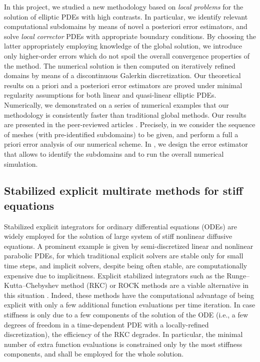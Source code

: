 \documentclass[10pt]{article}
\begin{document}
In this project, we studied a new methodology based on \textit{local problems} for the solution of elliptic PDEs with high contrasts. In particular, we identify relevant computational subdomains by means of novel a posteriori error estimators, and solve \textit{local corrector} PDEs with appropriate boundary conditions. By choosing the latter appropriately employing knowledge of the global solution, we introduce only higher-order errors which do not spoil the overall convergence properties of the method. The numerical solution is then computed on iteratively refined domains by means of a discontinuous Galerkin discretization. Our theoretical results on a priori and a posteriori error estimators are proved under minimal regularity assumptions for both linear and quasi-linear elliptic PDEs. Numerically, we demonstrated on a series of numerical examples that our methodology is consistently faster than traditional global methods. Our results are presented in the peer-reviewed articles \cite{AbR19, AbR22}. Precisely, in \cite{AbR19} we consider the sequence of meshes (with pre-identified subdomains) to be given, and perform a full a priori error analysis of our numerical scheme. In \cite{AbR22}, we design the error estimator that allows to identify the subdomains and to run the overall numerical simulation.

\subsection{Stabilized explicit multirate methods for stiff equations}\label{sec:Rosilho_2}

Stabilized explicit integrators for ordinary differential equations (ODEs) are widely employed for the solution of large system of stiff nonlinear diffusive equations. A prominent example is given by semi-discretized linear and nonlinear parabolic PDEs, for which traditional explicit solvers are stable only for small time steps, and implicit solvers, despite being often stable, are computationally expensive due to implicitness. Explicit stabilized integrators such as the Runge--Kutta--Chebyshev method (RKC) or ROCK methods are a viable alternative in this situation \cite{Ver96,Abd01,Abd02,AbM01}. Indeed, these methods have the computational advantage of being explicit with only a few additional function evaluations per time iteration. In case stiffness is only due to a few components of the solution of the ODE (i.e., a few degrees of freedom in a time-dependent PDE with a locally-refined discretization), the efficiency of the RKC degrades. In particular, the minimal number of extra function evaluations is constrained only by the most stiffness components, and shall be employed for the whole solution.
\end{document}
